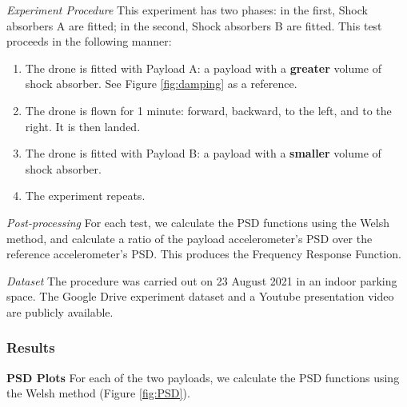 \textit{Experiment Procedure} \hspace{0.3cm}  This experiment has two phases: in the first, Shock absorbers A are fitted; in the second, Shock absorbers B are fitted. This test proceeds in the following manner: 
\begin{enumerate}
    \item The drone is fitted with Payload A: a payload with a \textbf{greater} volume of shock absorber. See Figure \ref{fig:damping} as a reference.
    \item The drone is flown for 1 minute: forward, backward, to the left, and to the right. It is then landed.
    \item The drone is fitted with Payload B: a payload with a \textbf{smaller} volume of shock absorber.
    \item The experiment repeats.
\end{enumerate}

\textit{Post-processing} \hspace{0.3cm}  For each test, we calculate the PSD functions using the Welsh method, and calculate a ratio of the payload accelerometer's PSD over the reference accelerometer's PSD. This produces the Frequency Response Function.



\textit{Dataset} \hspace {0.3cm} The procedure was carried out on 23 August 2021 in an indoor parking space. The Google Drive experiment dataset \cite{vibrationmount_dataset} and a Youtube presentation video \cite{vibrationmount_video} are publicly available.

\subsubsection{Results}
\textbf{PSD Plots} For each of the two payloads, we calculate the PSD functions using the Welsh method (Figure \ref{fig:PSD}).

